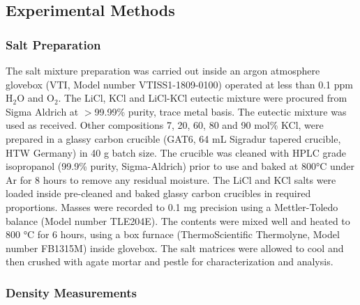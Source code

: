 \documentclass[review]{elsarticle}
\begin{document}
\subsection{Experimental Methods}

\subsubsection{Salt Preparation}

The salt mixture preparation was carried out inside an argon atmosphere glovebox (VTI, Model number VTISS1-1809-0100) operated at less than 0.1 ppm H$_{2}$O and O$_{2}$. The LiCl, KCl and LiCl-KCl eutectic mixture were procured from Sigma Aldrich at $>$99.99\% purity, trace metal basis. The eutectic mixture was used as received. Other compositions 7, 20, 60, 80 and 90 mol\% KCl, were prepared in a glassy carbon crucible (GAT6, 64 mL Sigradur tapered crucible, HTW Germany) in 40 g batch size. The crucible was cleaned with HPLC grade isopropanol (99.9\% purity, Sigma-Aldrich) prior to use and baked at 800°C under Ar for 8 hours to remove any residual moisture. The LiCl and KCl salts were loaded inside pre-cleaned and baked glassy carbon crucibles in required proportions. Masses were recorded to 0.1 mg precision using a Mettler-Toledo balance (Model number TLE204E). The contents were mixed well and heated to 800 °C for 6 hours, using a box furnace (ThermoScientific Thermolyne, Model number FB1315M) inside glovebox. The salt matrices were allowed to cool and then crushed with agate mortar and pestle for characterization and analysis. 

\subsubsection{Density Measurements} 
\end{document}
